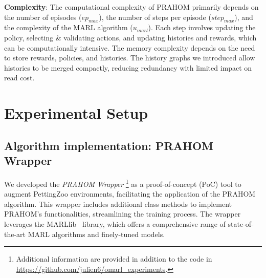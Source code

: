 \documentclass[conference]{IEEEtran}
\begin{document}
\textbf{Complexity}: \quad The computational complexity of PRAHOM primarily depends on the number of episodes ($ep_{max}$), the number of steps per episode ($step_{max}$), and the complexity of the MARL algorithm ($u_{marl}$). Each step involves updating the policy, selecting \& validating actions, and updating histories and rewards, which can be computationally intensive. The memory complexity depends on the need to store rewards, policies, and histories. The history graphs we introduced allow histories to be merged compactly, reducing redundancy with limited impact on read cost.




\section{Experimental Setup}\label{sec:experimental_setup}

\subsection{Algorithm implementation: PRAHOM Wrapper}

We developed the \textit{PRAHOM Wrapper}
%
\footnote{Additional information are provided in addition to the code in \url{https://github.com/julien6/omarl_experiments}.}
%
as a proof-of-concept (PoC) tool to augment PettingZoo environments, facilitating the application of the PRAHOM algorithm. This wrapper includes additional class methods to implement PRAHOM's functionalities, streamlining the training process. The wrapper leverages the MARLlib~\cite{hu2022marllib} library, which offers a comprehensive range of state-of-the-art MARL algorithms and finely-tuned models.
\end{document}

